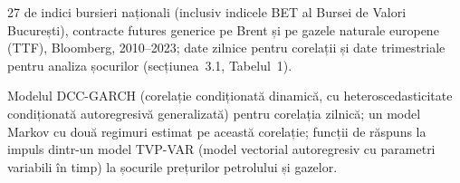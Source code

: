 \textbf{} %
{27 de indici bursieri naționali (inclusiv indicele BET al Bursei de Valori București), contracte futures generice pe Brent și pe gazele naturale europene (TTF), Bloomberg, 2010--2023; date zilnice pentru corelații și date trimestriale pentru analiza șocurilor (secțiunea~3.1, Tabelul~1).}

\textbf{} %
{Modelul DCC-GARCH (corelație condiționată dinamică, cu heteroscedasticitate condiționată autoregresivă generalizată) pentru corelația zilnică;
un model Markov cu două regimuri estimat pe această corelație; funcții de răspuns la impuls dintr-un model TVP-VAR (model vectorial autoregresiv cu parametri variabili în timp) la șocurile prețurilor petrolului și gazelor.}

